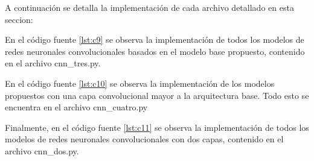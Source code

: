 A continuación se detalla la implementación de cada archivo detallado en esta seccion:

En el código fuente \ref{lst:c9} se observa la implementación de todos los modelos de redes neuronales convolucionales basados en el modelo base propuesto, contenido en el archivo cnn\_tres.py.



En el código fuente \ref{lst:c10} se observa la implementación de los modelos propuestos con una capa convolucional mayor a la arquitectura base. Todo esto se encuentra en el archivo cnn\_cuatro.py



Finalmente, en el código fuente \ref{lst:c11} se observa la implementación de todos los modelos de redes neuronales convolucionales con dos capas, contenido en el archivo cnn\_dos.py.





